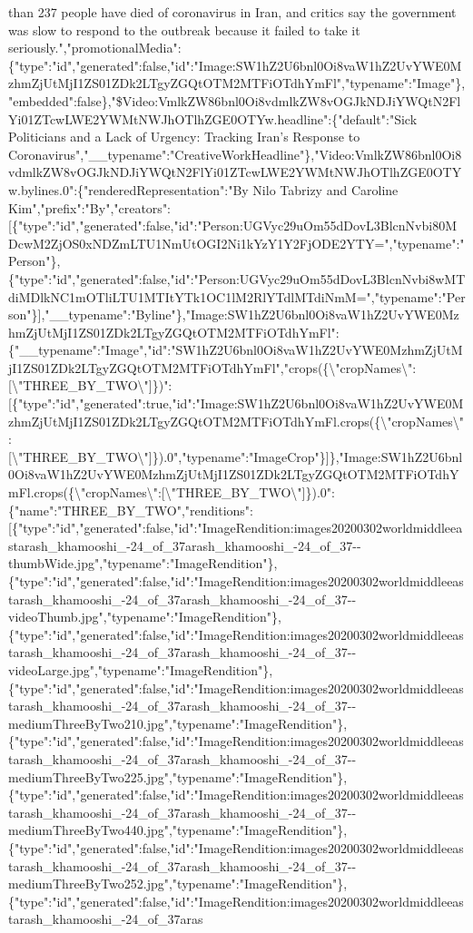 than 237 people have died of coronavirus in Iran, and critics say the
government was slow to respond to the outbreak because it failed to take
it
seriously.","promotionalMedia":\{"type":"id","generated":false,"id":"Image:SW1hZ2U6bnl0Oi8vaW1hZ2UvYWE0MzhmZjUtMjI1ZS01ZDk2LTgyZGQtOTM2MTFiOTdhYmFl","typename":"Image"\},"embedded":false\},"\$Video:VmlkZW86bnl0Oi8vdmlkZW8vOGJkNDJiYWQtN2FlYi01ZTcwLWE2YWMtNWJhOTlhZGE0OTYw.headline":\{"default":"Sick
Politicians and a Lack of Urgency: Tracking Iran's Response to
Coronavirus","\_\_typename":"CreativeWorkHeadline"\},"Video:VmlkZW86bnl0Oi8vdmlkZW8vOGJkNDJiYWQtN2FlYi01ZTcwLWE2YWMtNWJhOTlhZGE0OTYw.bylines.0":\{"renderedRepresentation":"By
Nilo Tabrizy and Caroline
Kim","prefix":"By","creators":{[}\{"type":"id","generated":false,"id":"Person:UGVyc29uOm55dDovL3BlcnNvbi80MDcwM2ZjOS0xNDZmLTU1NmUtOGI2Ni1kYzY1Y2FjODE2YTY=","typename":"Person"\},\{"type":"id","generated":false,"id":"Person:UGVyc29uOm55dDovL3BlcnNvbi8wMTdiMDlkNC1mOTliLTU1MTItYTk1OC1lM2RlYTdlMTdiNmM=","typename":"Person"\}{]},"\_\_typename":"Byline"\},"Image:SW1hZ2U6bnl0Oi8vaW1hZ2UvYWE0MzhmZjUtMjI1ZS01ZDk2LTgyZGQtOTM2MTFiOTdhYmFl":\{"\_\_typename":"Image","id":"SW1hZ2U6bnl0Oi8vaW1hZ2UvYWE0MzhmZjUtMjI1ZS01ZDk2LTgyZGQtOTM2MTFiOTdhYmFl","crops(\{\textbackslash{}"cropNames\textbackslash{}":{[}\textbackslash{}"THREE\_BY\_TWO\textbackslash{}"{]}\})":{[}\{"type":"id","generated":true,"id":"Image:SW1hZ2U6bnl0Oi8vaW1hZ2UvYWE0MzhmZjUtMjI1ZS01ZDk2LTgyZGQtOTM2MTFiOTdhYmFl.crops(\{\textbackslash{}"cropNames\textbackslash{}":{[}\textbackslash{}"THREE\_BY\_TWO\textbackslash{}"{]}\}).0","typename":"ImageCrop"\}{]}\},"Image:SW1hZ2U6bnl0Oi8vaW1hZ2UvYWE0MzhmZjUtMjI1ZS01ZDk2LTgyZGQtOTM2MTFiOTdhYmFl.crops(\{\textbackslash{}"cropNames\textbackslash{}":{[}\textbackslash{}"THREE\_BY\_TWO\textbackslash{}"{]}\}).0":\{"name":"THREE\_BY\_TWO","renditions":{[}\{"type":"id","generated":false,"id":"ImageRendition:images20200302worldmiddleeastarash\_khamooshi\_-24\_of\_37arash\_khamooshi\_-24\_of\_37-\/-thumbWide.jpg","typename":"ImageRendition"\},\{"type":"id","generated":false,"id":"ImageRendition:images20200302worldmiddleeastarash\_khamooshi\_-24\_of\_37arash\_khamooshi\_-24\_of\_37-\/-videoThumb.jpg","typename":"ImageRendition"\},\{"type":"id","generated":false,"id":"ImageRendition:images20200302worldmiddleeastarash\_khamooshi\_-24\_of\_37arash\_khamooshi\_-24\_of\_37-\/-videoLarge.jpg","typename":"ImageRendition"\},\{"type":"id","generated":false,"id":"ImageRendition:images20200302worldmiddleeastarash\_khamooshi\_-24\_of\_37arash\_khamooshi\_-24\_of\_37-\/-mediumThreeByTwo210.jpg","typename":"ImageRendition"\},\{"type":"id","generated":false,"id":"ImageRendition:images20200302worldmiddleeastarash\_khamooshi\_-24\_of\_37arash\_khamooshi\_-24\_of\_37-\/-mediumThreeByTwo225.jpg","typename":"ImageRendition"\},\{"type":"id","generated":false,"id":"ImageRendition:images20200302worldmiddleeastarash\_khamooshi\_-24\_of\_37arash\_khamooshi\_-24\_of\_37-\/-mediumThreeByTwo440.jpg","typename":"ImageRendition"\},\{"type":"id","generated":false,"id":"ImageRendition:images20200302worldmiddleeastarash\_khamooshi\_-24\_of\_37arash\_khamooshi\_-24\_of\_37-\/-mediumThreeByTwo252.jpg","typename":"ImageRendition"\},\{"type":"id","generated":false,"id":"ImageRendition:images20200302worldmiddleeastarash\_khamooshi\_-24\_of\_37aras
